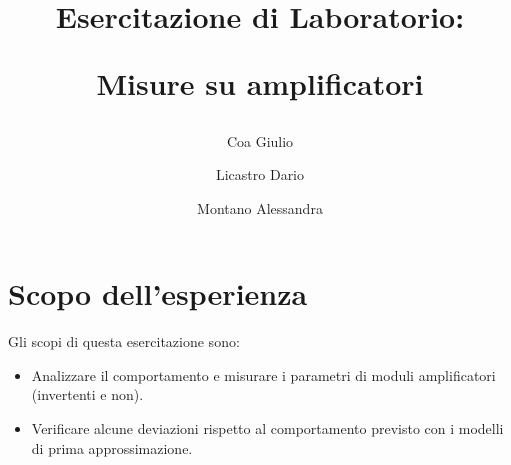 \documentclass[a4paper]{article}
\title{
	\begin{center}
		Esercitazione di Laboratorio:
	\end{center}
	\newline
	\begin{center}
		Misure su amplificatori
	\end{center}
}
\author{
	Coa Giulio
	\and
	Licastro Dario
	\and
	Montano Alessandra
}
\begin{document}
	\begin{titlingpage}
		\maketitle
	\end{titlingpage}
	\newpage
	\section{Scopo dell'esperienza}
		Gli scopi di questa esercitazione sono:
		\begin{itemize}
			\item Analizzare il comportamento e misurare i parametri di moduli amplificatori (invertenti e non).
			\item Verificare alcune deviazioni rispetto al comportamento previsto con i modelli di prima approssimazione.
		\end{itemize}
\end{document}
